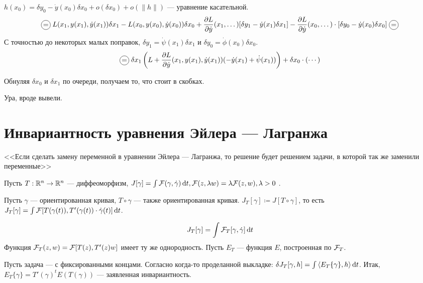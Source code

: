 \documentclass[a4paper]{article}
\begin{document}
    $h(x_0) = \delta y_0 - \dot{y}(x_0)\delta x_0 + o(\delta x_0) + o(\|h\|)$ --- уравнение касательной.
    \[\circlesign{=}L(x_1, y(x_1), \dot{y}(x_1))\delta x_1 - L(x_0, y(x_0), \dot{y}(x_0))\delta x_0 + \der{L}{\dot{y}}(x_1, \dots)[\delta y_1 - \dot{y}(x_1)\delta x_1] - \der{L}{\dot{y}}(x_0,\dots) \cdot [\delta y_0 - \dot{y}(x_0)\delta x_0]\circlesign{=}\]
    С точностью до некоторых малых поправок, $\delta y_1 = \dot{\psi}(x_1)\delta x_1$ и $\delta y_0 = \dot{\phi}(x_0)\delta x_0$.
    \[\circlesign{=}\delta  x_1\left(L + \der{L}{\dot{y}}(x_1, y(x_1), \dot{y}(x_1))(-\dot{y}(x_1) + \dot{\psi}(x_1))\right) + \delta x_0 \cdot (\cdots)\]
    
    Обнуляя $\delta x_0$ и $\delta x_1$ по очереди, получаем то, что стоит в скобках.
    
    Ура, вроде вывели.
    \section{Инвариантность уравнения Эйлера --- Лагранжа}
    <<Если сделать замену переменной в уравнении Эйлера --- Лагранжа, то решение будет решением задачи, в которой так же заменили переменные>>

    Пусть $T: \mathbb{R}^n \rightarrow \mathbb{R}^n$ --- диффеоморфизм, $J[\gamma] = \int\mathcal{F}(\gamma, \dot{\gamma})\operatorname{d}\! t, \mathcal{F}(z, \lambda w) = \lambda\mathcal{F}(z, w), \lambda > 0$ . %

    Пусть $\gamma$ --- ориентированная кривая, $T \circ \gamma$ --- также ориентированная кривая.
    $J_T[\gamma] \coloneqq J[T \circ \gamma]$, то есть $J_T[\gamma] = \int \mathcal{F}[T(\gamma(t)), T'(\gamma(t)) \cdot \dot{\gamma}(t)]\operatorname{d}\! t$.

    \[J_T[\gamma] = \int\mathcal{F}_T[\gamma, \dot{\gamma}]\operatorname{d}\! t\]
    Функция $\mathcal{F}_T(z, w) = \mathcal{F}[T(z), T'(z)w]$ имеет ту же однородность.
    Пусть $E_T$ --- функция $E$, построенная по $\mathcal{F}_T$.

    Пусть задача --- с фиксированными концами.
    Согласно когда-то проделанной выкладке: $\delta J_T[\gamma, h] = \int\left\langle E_T\{\gamma\}, h\right\rangle\operatorname{d}\! t$. %
    Итак, $E_T\{\gamma\} = T'(\gamma)^t E(T(\gamma))$ --- заявленная инвариантность. 
    
\end{document}
